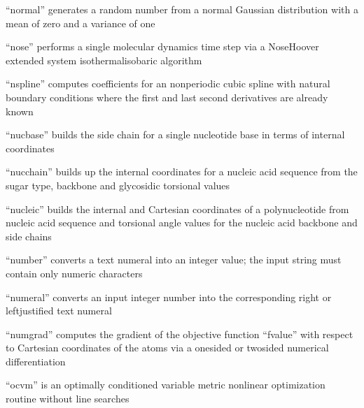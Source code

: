 \documentclass[letterpaper,11pt,english]{sphinxmanual}
\begin{document}

“normal” generates a random number from a normal Gaussian
distribution with a mean of zero and a variance of one


“nose” performs a single molecular dynamics time step via
a Nose\sphinxhyphen{}Hoover extended system isothermal\sphinxhyphen{}isobaric algorithm


“nspline” computes coefficients for an nonperiodic cubic spline
with natural boundary conditions where the first and last second
derivatives are already known


“nucbase” builds the side chain for a single nucleotide base
in terms of internal coordinates


“nucchain” builds up the internal coordinates for a nucleic
acid sequence from the sugar type, backbone and glycosidic
torsional values


“nucleic” builds the internal and Cartesian coordinates
of a polynucleotide from nucleic acid sequence and torsional
angle values for the nucleic acid backbone and side chains


“number” converts a text numeral into an integer value;
the input string must contain only numeric characters


“numeral” converts an input integer number into the
corresponding right\sphinxhyphen{} or left\sphinxhyphen{}justified text numeral


“numgrad” computes the gradient of the objective function
“fvalue” with respect to Cartesian coordinates of the atoms
via a one\sphinxhyphen{}sided or two\sphinxhyphen{}sided numerical differentiation


“ocvm” is an optimally conditioned variable metric nonlinear
optimization routine without line searches

\end{document}
